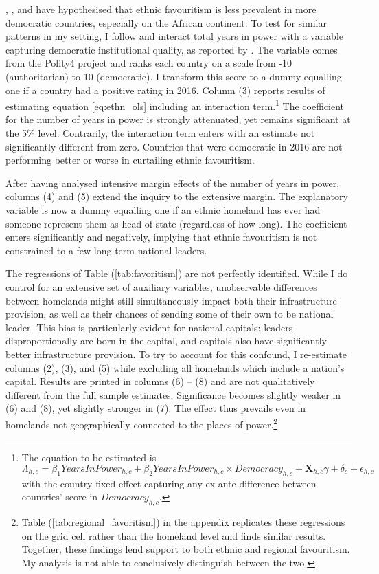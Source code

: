 \documentclass[11pt, oneside]{article}   	%
\let\oldref\ref
\renewcommand{\ref}[1]{(\oldref{#1})}
\begin{document}
\cite{DeLuca_Ethnicfavoritismaxiom_2018}, \cite{Hodler_RegionalFavoritism_2014}, and \cite{Burgess_ValueDemocracyEvidence_2015} have hypothesised that ethnic favouritism is less prevalent in more democratic countries, especially on the African continent. To test for similar patterns in my setting, I follow \citeauthor{DeLuca_Ethnicfavoritismaxiom_2018} and interact total years in power with a variable capturing democratic institutional quality, as reported by \cite{Marshall_PolityProjectCenter_2015}. The variable comes from the Polity4 project and ranks each country on a scale from -10 (authoritarian) to 10 (democratic). I transform this score to a dummy equalling one if a country had a positive rating in 2016. Column (3) reports results of estimating equation \eqref{eq:ethn_ols} including an interaction term.\footnote{The equation to be estimated is \begin{equation*}
  \Lambda_{h,c} = \beta_{1} YearsInPower_{h,c} + \beta_{2} YearsInPower_{h,c}\times Democracy_{h,c} + \textbf{X}_{h,c}\gamma + \delta_{c} + \epsilon_{h,c}
\end{equation*} with the country fixed effect capturing any ex-ante difference between countries' score in $Democracy_{h,c}$.} The coefficient for the number of years in power is strongly attenuated, yet remains significant at the 5\% level. Contrarily, the interaction term enters with an estimate not significantly different from zero. Countries that were democratic in 2016 are not performing better or worse in curtailing ethnic favouritism.

After having analysed intensive margin effects of the number of years in power, columns (4) and (5) extend the inquiry to the extensive margin. The explanatory variable is now a dummy equalling one if an ethnic homeland has ever had someone represent them as head of state (regardless of how long). The coefficient enters significantly and negatively, implying that ethnic favouritism is not constrained to a few long-term national leaders.

The regressions of Table \ref{tab:favoritism} are not perfectly identified. While I do control for an extensive set of auxiliary variables, unobservable differences between homelands might still simultaneously impact both their infrastructure provision, as well as their chances of sending some of their own to be national leader. This bias is particularly evident for national capitals: leaders disproportionally are born in the capital, and capitals also have significantly better infrastructure provision. To try to account for this confound, I re-estimate columns (2), (3), and (5) while excluding all homelands which include a nation's capital. Results are printed in columns (6) -- (8) and are not qualitatively different from the full sample estimates. Significance becomes slightly weaker in (6) and (8), yet slightly stronger in (7). The effect thus prevails even in homelands not geographically connected to the places of power.\footnote{Table \ref{tab:regional_favoritism} in the appendix replicates these regressions on the grid cell rather than the homeland level and finds similar results. Together, these findings lend support to both ethnic and regional favouritism. My analysis is not able to conclusively distinguish between the two.}
\end{document}
